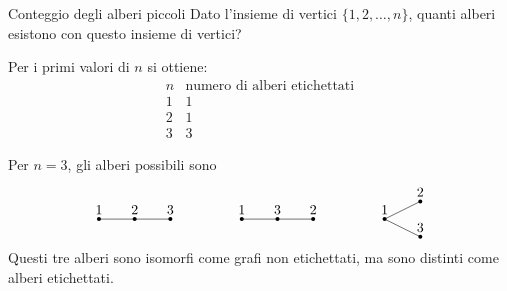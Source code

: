 \documentclass[a4paper]{article}
\begin{document}
\begin{snippetexercise}{Conteggio degli alberi piccoli}
    Dato l'insieme di vertici \(\{1,2,\ldots,n\}\), quanti alberi esistono con questo insieme di vertici?

    Per i primi valori di \(n\) si ottiene:
    \[
        \begin{array}{c|c}
            n & \text{numero di alberi etichettati} \\
            \hline
            1 & 1 \\
            2 & 1 \\
            3 & 3
        \end{array}
    \]

    Per \(n=3\), gli alberi possibili sono
    \[
        \begin{tikzpicture}[scale=0.9,baseline={(current bounding box.center)}]
            \begin{scope}
                \coordinate (a) at (0,0);
                \coordinate (b) at (1,0);
                \coordinate (c) at (2,0);
                \draw (a)--(b)--(c);
                \foreach \p/\lab in {a/1,b/2,c/3}{
                    \fill (\p) circle (1.6pt);
                    \node[above] at (\p) {\(\lab\)};
                }
            \end{scope}

            \begin{scope}[xshift=4cm]
                \coordinate (a) at (0,0);
                \coordinate (b) at (1,0);
                \coordinate (c) at (2,0);
                \draw (a)--(b)--(c);
                \foreach \p/\lab in {a/1,b/3,c/2}{
                    \fill (\p) circle (1.6pt);
                    \node[above] at (\p) {\(\lab\)};
                }
            \end{scope}

            \begin{scope}[xshift=8cm]
                \coordinate (a) at (0,0);
                \coordinate (b) at (1,0.5);
                \coordinate (c) at (1,-0.5);
                \draw (a)--(b);
                \draw (a)--(c);
                \foreach \p/\lab in {a/1,b/2,c/3}{
                    \fill (\p) circle (1.6pt);
                    \node[above] at (\p) {\(\lab\)};
                }
            \end{scope}
        \end{tikzpicture}
    \]
    Questi tre alberi sono isomorfi come grafi non etichettati, ma sono distinti come alberi etichettati.
\end{snippetexercise}
\end{document}
